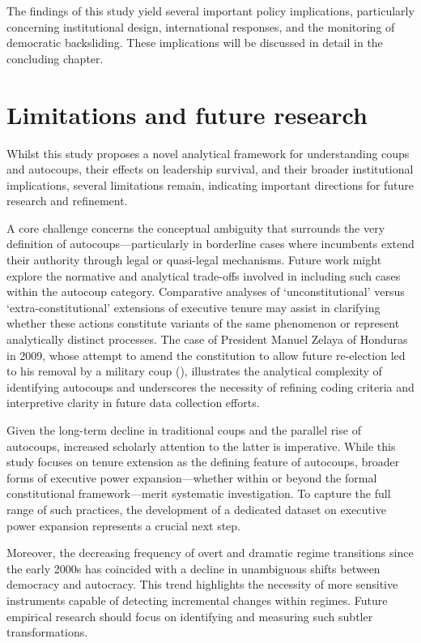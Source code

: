 \documentclass[
  12pt,
]{report}
\begin{document}
The findings of this study yield several important policy implications,
particularly concerning institutional design, international responses,
and the monitoring of democratic backsliding. These implications will be
discussed in detail in the concluding chapter.

\section{Limitations and future
research}\label{limitations-and-future-research}

Whilst this study proposes a novel analytical framework for
understanding coups and autocoups, their effects on leadership survival,
and their broader institutional implications, several limitations
remain, indicating important directions for future research and
refinement.

A core challenge concerns the conceptual ambiguity that surrounds the
very definition of autocoups---particularly in borderline cases where
incumbents extend their authority through legal or quasi-legal
mechanisms. Future work might explore the normative and analytical
trade-offs involved in including such cases within the autocoup
category. Comparative analyses of `unconstitutional' versus
`extra-constitutional' extensions of executive tenure may assist in
clarifying whether these actions constitute variants of the same
phenomenon or represent analytically distinct processes. The case of
President Manuel Zelaya of Honduras in 2009, whose attempt to amend the
constitution to allow future re-election led to his removal by a
military coup (), illustrates the analytical complexity of identifying
autocoups and underscores the necessity of refining coding criteria and
interpretive clarity in future data collection efforts.

Given the long-term decline in traditional coups and the parallel rise
of autocoups, increased scholarly attention to the latter is imperative.
While this study focuses on tenure extension as the defining feature of
autocoups, broader forms of executive power expansion---whether within
or beyond the formal constitutional framework---merit systematic
investigation. To capture the full range of such practices, the
development of a dedicated dataset on executive power expansion
represents a crucial next step.

Moreover, the decreasing frequency of overt and dramatic regime
transitions since the early 2000s has coincided with a decline in
unambiguous shifts between democracy and autocracy. This trend
highlights the necessity of more sensitive instruments capable of
detecting incremental changes within regimes. Future empirical research
should focus on identifying and measuring such subtler transformations.
\end{document}
